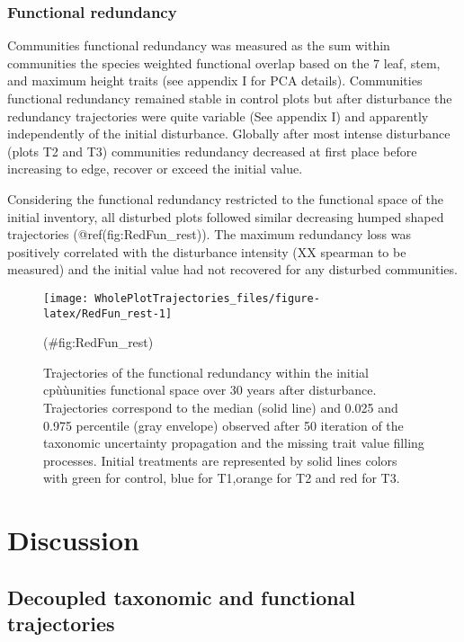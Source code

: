 \documentclass[fleqn,10pt]{ArtEcoFoG} %
\theoremstyle{definition}
\theoremstyle{definition}
\theoremstyle{definition}
\theoremstyle{remark}
\begin{document}
\subsubsection{Functional redundancy}\label{functional-redundancy}

Communities functional redundancy was measured as the sum within
communities the species weighted functional overlap based on the 7 leaf,
stem, and maximum height traits (see appendix I for PCA details).
Communities functional redundancy remained stable in control plots but
after disturbance the redundancy trajectories were quite variable (See
appendix I) and apparently independently of the initial disturbance.
Globally after most intense disturbance (plots T2 and T3) communities
redundancy decreased at first place before increasing to edge, recover
or exceed the initial value.

Considering the functional redundancy restricted to the functional space
of the initial inventory, all disturbed plots followed similar
decreasing humped shaped trajectories (@ref(fig:RedFun\_rest)). The
maximum redundancy loss was positively correlated with the disturbance
intensity (XX spearman to be measured) and the initial value had not
recovered for any disturbed communities.

\begin{figure}

{\centering \texttt{[image: WholePlotTrajectories\_files/figure-latex/RedFun\_rest-1]} 

}

\caption{Trajectories of the functional redundancy within the initial cpùùunities functional space over 30 years after disturbance. Trajectories correspond to the median (solid line) and 0.025 and 0.975 percentile (gray envelope) observed after 50 iteration of the taxonomic uncertainty propagation and the missing trait value filling processes. Initial treatments are represented by solid lines colors with green for control, blue for T1,orange for T2 and red for T3.}(\#fig:RedFun_rest)
\end{figure}

\section{Discussion}\label{discussion}

\subsection{Decoupled taxonomic and functional
trajectories}\label{decoupled-taxonomic-and-functional-trajectories}
\end{document}
